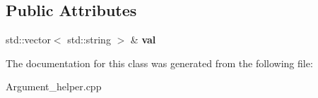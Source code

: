 \subsection*{Public Attributes}
\begin{DoxyCompactItemize}
\item 
\hypertarget{classdsr_1_1_argument__helper_1_1_string_vector_target_a4fb78576f9c6adc639202d560493808c}{
std::vector$<$ std::string $>$ \& {\bfseries val}}
\label{classdsr_1_1_argument__helper_1_1_string_vector_target_a4fb78576f9c6adc639202d560493808c}

\end{DoxyCompactItemize}


The documentation for this class was generated from the following file:\begin{DoxyCompactItemize}
\item 
Argument\_\-helper.cpp\end{DoxyCompactItemize}
